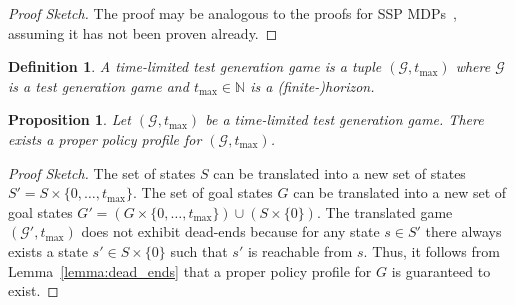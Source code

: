 \documentclass[10pt]{article}
\theoremstyle{plain}
\newtheorem{definition}{Definition}
\newtheorem{proposition}{Proposition}
\begin{document}
\begin{proof}[Proof Sketch]
    The proof may be analogous to the proofs for SSP MDPs~\cite{Kolobov:book:2012}, assuming it has not been proven already.
\end{proof}

\begin{definition}
    A time-limited test generation game is a tuple $(\mathcal{G}, t_{\max})$ where $\mathcal{G}$ is a test generation game and $t_{\max} \in \mathbb{N}$ is a (finite-)horizon.
\end{definition}

\begin{proposition}
    Let $(\mathcal{G}, t_{\max})$ be a time-limited test generation game.
    There exists a proper policy profile for $(\mathcal{G}, t_{\max})$.
\end{proposition}

\begin{proof}[Proof Sketch]
    The set of states $S$ can be translated into a new set of states $S' = S \times \{ 0, \dots, t_{\max} \}$.
    The set of goal states $G$ can be translated into a new set of goal states $G' = \left( G \times \{ 0, \dots, t_{\max} \} \right) \cup \left( S \times \{ 0 \} \right)$.
    The translated game $(\mathcal{G}', t_{\max})$ does not exhibit dead-ends because for any state $s \in S'$ there always exists a state $s' \in S \times \{ 0 \}$ such that $s'$ is reachable from $s$.
    Thus, it follows from Lemma~\ref{lemma:dead_ends} that a proper policy profile for $G$ is guaranteed to exist.
\end{proof}
\end{document}
